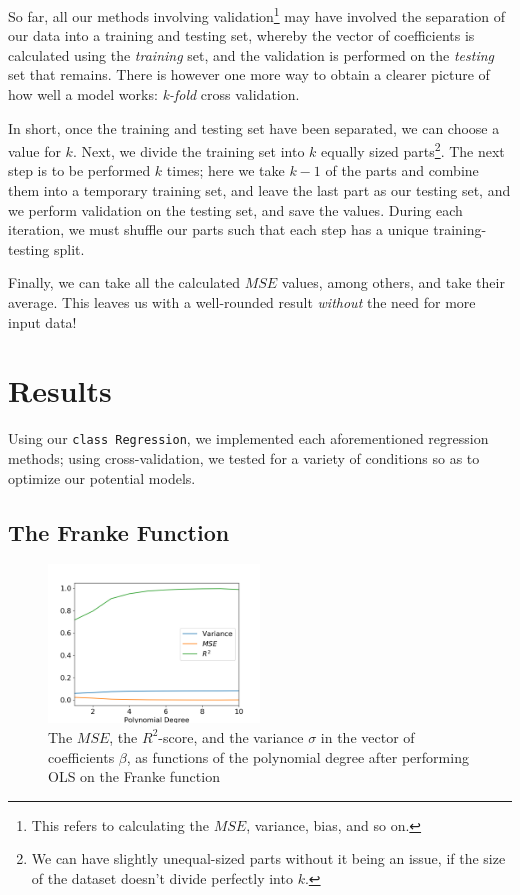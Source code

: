 \documentclass[a4paper,10pt,english]{article}
\begin{document}
\begin{multicols*}{2}
So far, all our methods involving validation\footnote{This refers to calculating the $MSE$, variance, bias, and so on.} may have involved the separation of our data into a training and testing set, whereby the vector of coefficients is calculated using the \textit{training} set, and the validation is performed on the \textit{testing} set that remains.	There is however one more way to obtain a clearer picture of how well a model works: \textit{k-fold} cross validation.	

In short, once the training and testing set have been separated, we can choose a value for $k$.  Next, we divide the training set into $k$ equally sized parts\footnote{We can have slightly unequal-sized parts without it being an issue, if the size of the dataset doesn't divide perfectly into $k$.}.  The next step is to be performed $k$ times; here we take $k-1$ of the parts and combine them into a temporary training set, and leave the last part as our testing set, and we perform validation on the testing set, and save the values.  During each iteration, we must shuffle our parts such that each step has a unique training-testing split.

Finally, we can take all the calculated $MSE$ values, among others, and take their average.  This leaves us with a well-rounded result \textit{without} the need for more input data!

\section*{Results}
\label{sec:results}

Using our \texttt{class Regression}, we implemented each aforementioned regression methods; using cross-validation, we tested for a variety of conditions so as to optimize our potential models. 

\subsection*{The Franke Function}

\begin{figure}[H]
	\centering  
	\includegraphics[width = 0.5\textwidth, center]{../franke_output/part_A.png}
	\caption{The $MSE$, the $R^2$-score, and the variance $\sigma$ in the vector of coefficients $\beta$, as functions of the polynomial degree after performing OLS on the Franke function}
	\label{fig_4}
\end{figure}


\end{multicols*}
\end{document}
